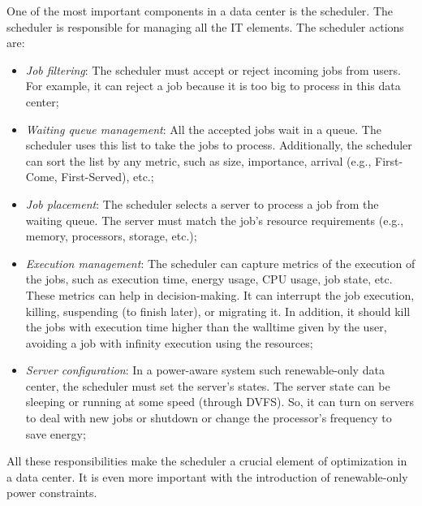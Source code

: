 One of the most important components in a data center is the scheduler. The scheduler is responsible for managing all the IT elements. The scheduler actions are:
\begin{itemize}
    \item \textit{Job filtering}: The scheduler must accept or reject incoming jobs from users. For example, it can reject a job because it is too big to process in this data center;
    \item \textit{Waiting queue management}: All the accepted jobs wait in a queue. The scheduler uses this list to take the jobs to process. Additionally, the scheduler can sort the list by any metric, such as size, importance, arrival (e.g., First-Come, First-Served), etc.;
    \item \textit{Job placement}: The scheduler selects a server to process a job from the waiting queue. The server must match the job's resource requirements (e.g., memory, processors, storage, etc.);
    \item \textit{Execution management}: The scheduler can capture metrics of the execution of the jobs, such as execution time, energy usage, CPU usage, job state, etc. These metrics can help in decision-making. It can interrupt the job execution, killing, suspending (to finish later), or migrating it. In addition, it should kill the jobs with execution time higher than the walltime given by the user, avoiding a job with infinity execution using the resources;
    \item \textit{Server configuration}: In a power-aware system such renewable-only data center, the scheduler must set the server's states. The server state can be sleeping or running at some speed (through DVFS). So, it can turn on servers to deal with new jobs or shutdown or change the processor's frequency to save energy;
\end{itemize}
All these responsibilities make the scheduler a crucial element of optimization in a data center. It is even more important with the introduction of renewable-only power constraints.


